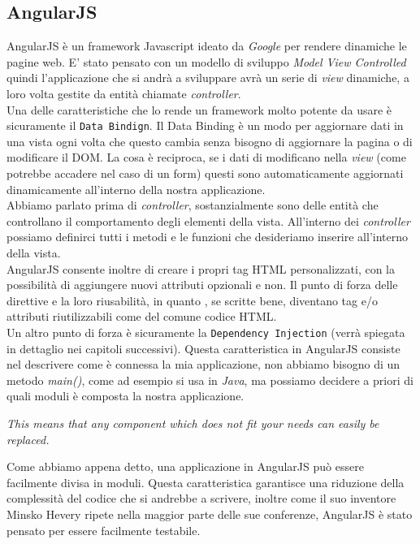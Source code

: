 \subsection{AngularJS}
AngularJS è un framework Javascript ideato da \emph{Google} per rendere dinamiche le pagine web. E' stato pensato con un modello di sviluppo \emph{Model View Controlled} quindi l'applicazione che si andrà a sviluppare avrà un serie di \emph{view} dinamiche, a loro volta gestite da entità chiamate \emph{controller}.\\
Una delle caratteristiche che lo rende un framework molto potente da usare è sicuramente il \texttt{Data Bindign}. Il Data Binding è un modo per aggiornare dati in una vista ogni volta che questo cambia senza bisogno di aggiornare la pagina o di modificare il DOM. La cosa è reciproca, se i dati di modificano nella \emph{view} (come potrebbe accadere nel caso di un form) questi sono automaticamente aggiornati dinamicamente all'interno della nostra applicazione.\\
Abbiamo parlato prima di \emph{controller}, sostanzialmente sono delle entità che controllano il comportamento degli elementi della vista. All'interno dei \emph{controller} possiamo definirci tutti i metodi e le funzioni che desideriamo inserire all'interno della vista.\\
AngularJS consente inoltre di creare i propri tag HTML personalizzati, con la possibilità di aggiungere nuovi attributi opzionali e non. Il punto di forza delle direttive e la loro riusabilità, in quanto , se scritte bene, diventano tag e/o attributi riutilizzabili come del comune codice HTML.\\
Un altro punto di forza è sicuramente la \texttt{Dependency Injection} (verrà spiegata in dettaglio nei capitoli successivi). Questa caratteristica in AngularJS consiste nel descrivere come è connessa la mia applicazione, non abbiamo bisogno di un metodo \emph{main()}, come ad esempio si usa in \emph{Java}, ma possiamo decidere a priori di quali moduli è composta la nostra applicazione.
\begin{center}
\emph{This means that any component which does not fit your needs can easily be replaced.} 
\end{center}
Come abbiamo appena detto, una applicazione in AngularJS può essere facilmente divisa in moduli. Questa caratteristica garantisce una riduzione della complessità del codice che si andrebbe a scrivere, inoltre come il suo inventore Minsko Hevery ripete nella maggior parte delle sue conferenze, AngularJS è stato pensato per essere facilmente testabile.

